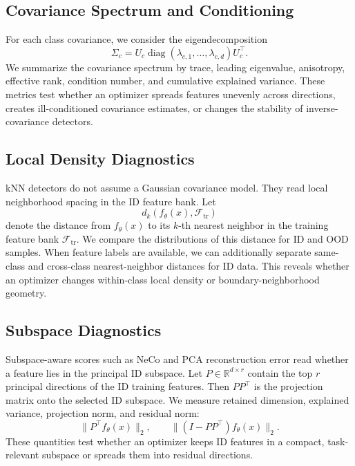 \subsection{Covariance Spectrum and Conditioning}
\label{app:covariance-spectrum-conditioning}

For each class covariance, we consider the eigendecomposition
\[
    \Sigma_c
    =
    U_c
    \operatorname{diag}(\lambda_{c,1},\ldots,\lambda_{c,d})
    U_c^\top .
\]
We summarize the covariance spectrum by trace, leading eigenvalue, anisotropy,
effective rank, condition number, and cumulative explained variance. These
metrics test whether an optimizer spreads features unevenly across directions,
creates ill-conditioned covariance estimates, or changes the stability of
inverse-covariance detectors.

\subsection{Local Density Diagnostics}
\label{app:local-density-diagnostics}

kNN detectors do not assume a Gaussian covariance model. They read local
neighborhood spacing in the ID feature bank. Let
\[
    d_k(f_\theta(x),\mathcal{F}_{\mathrm{tr}})
\]
denote the distance from \(f_\theta(x)\) to its \(k\)-th nearest neighbor in the
training feature bank \(\mathcal{F}_{\mathrm{tr}}\). We compare the
distributions of this distance for ID and OOD samples. When feature labels are
available, we can additionally separate same-class and cross-class
nearest-neighbor distances for ID data. This reveals whether an optimizer
changes within-class local density or boundary-neighborhood geometry.

\subsection{Subspace Diagnostics}
\label{app:subspace-diagnostics}

Subspace-aware scores such as NeCo and PCA reconstruction error read whether a
feature lies in the principal ID subspace. Let \(P\in\mathbb{R}^{d\times r}\)
contain the top \(r\) principal directions of the ID training features. Then
\(PP^\top\) is the projection matrix onto the selected ID subspace. We measure
retained dimension, explained variance, projection norm, and residual norm:
\[
    \|P^\top f_\theta(x)\|_2,
    \qquad
    \|(I-PP^\top)f_\theta(x)\|_2.
\]
These quantities test whether an optimizer keeps ID features in a compact,
task-relevant subspace or spreads them into residual directions.
